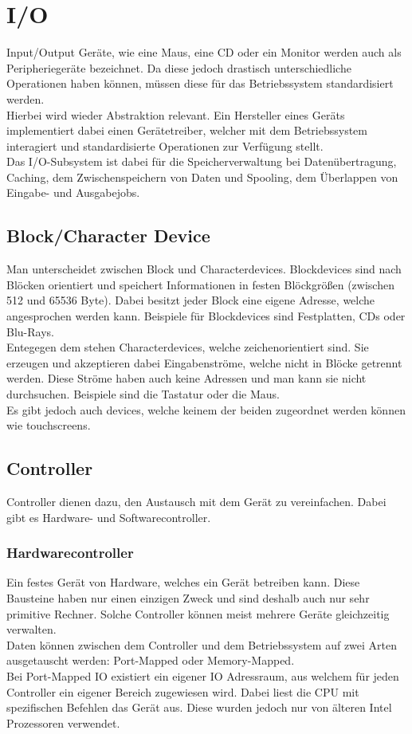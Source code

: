 \documentclass{article}
\begin{document}
	\section{I/O}
	Input/Output Geräte, wie eine Maus, eine CD oder ein Monitor werden auch als Peripheriegeräte bezeichnet. Da diese jedoch drastisch unterschiedliche Operationen haben können, müssen diese für das Betriebssystem standardisiert werden. \\
	Hierbei wird wieder Abstraktion relevant. Ein Hersteller eines Geräts implementiert dabei einen Gerätetreiber, welcher mit dem Betriebssystem interagiert und standardisierte Operationen zur Verfügung stellt. \\
	Das I/O-Subsystem ist dabei für die Speicherverwaltung bei Datenübertragung, Caching, dem Zwischenspeichern von Daten und Spooling, dem Überlappen von Eingabe- und Ausgabejobs. \\
	\subsection{Block/Character Device}
	Man unterscheidet zwischen Block und Characterdevices. Blockdevices sind nach Blöcken orientiert und speichert Informationen in festen Blöckgrößen (zwischen 512 und 65536 Byte). Dabei besitzt jeder Block eine eigene Adresse, welche angesprochen werden kann. Beispiele für Blockdevices sind Festplatten, CDs oder Blu-Rays. \\
	Entegegen dem stehen Characterdevices, welche zeichenorientiert sind. Sie erzeugen und akzeptieren dabei Eingabenströme, welche nicht in Blöcke getrennt werden. Diese Ströme haben auch keine Adressen und man kann sie nicht durchsuchen. Beispiele sind die Tastatur oder die Maus. \\
	Es gibt jedoch auch devices, welche keinem der beiden zugeordnet werden können wie touchscreens. \\
	\subsection{Controller}
	Controller dienen dazu, den Austausch mit dem Gerät zu vereinfachen. Dabei gibt es Hardware- und Softwarecontroller.
	\subsubsection{Hardwarecontroller}
	Ein festes Gerät von Hardware, welches ein Gerät betreiben kann. Diese Bausteine haben nur einen einzigen Zweck und sind deshalb auch nur sehr primitive Rechner. Solche Controller können meist mehrere Geräte gleichzeitig verwalten. \\
	Daten können zwischen dem Controller und dem Betriebssystem auf zwei Arten ausgetauscht werden: Port-Mapped oder Memory-Mapped.\\
	Bei Port-Mapped IO existiert ein eigener IO Adressraum, aus welchem für jeden Controller ein eigener Bereich zugewiesen wird. Dabei liest die CPU mit spezifischen Befehlen das Gerät aus. Diese wurden jedoch nur von älteren Intel Prozessoren verwendet. \\
	[TODO Memory-Mapped IO]
	
\end{document}
